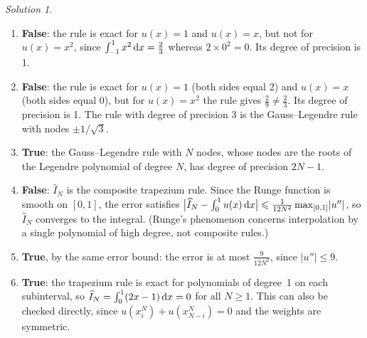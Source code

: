 \documentclass[10pt]{article}
\theoremstyle{definition}
\theoremstyle{remark}
\newtheorem*{protosolution}{Solution}
\newenvironment{solutionframe}
{%
    \begin{mdframed}[
        leftmargin=1cm,
        skipabove=.3cm,
        linecolor=blue,
        backgroundcolor=lightgreen,
        linewidth=0pt,
        innerleftmargin=.5em,
        innerrightmargin=.5em,
        innertopmargin=.3em,
        innerbottommargin=.6em,
    ]
}
{
    \end{mdframed}
}
\newenvironment{solution}
{\pushQED{\qed}\renewcommand{\qedsymbol}{$\triangle$}
\begin{solutionframe}\small \begin{protosolution}}
{\popQED\end{protosolution}\end{solutionframe}}
\begin{document}
\begin{solution}
    \begin{enumerate}
        \item \textbf{False}:
            the rule is exact for $u(x) = 1$ and $u(x) = x$,
            but not for $u(x) = x^2$,
            since $\int_{-1}^{1} x^2 \, \mathrm d x = \frac{2}{3}$ whereas $2 \times 0^2 = 0$.
            Its degree of precision is 1.

        \item \textbf{False}:
            the rule is exact for $u(x) = 1$ (both sides equal 2) and $u(x) = x$ (both sides equal 0),
            but for $u(x) = x^2$ the rule gives $\frac{2}{9} \neq \frac{2}{3}$.
            Its degree of precision is 1.
            The rule with degree of precision 3 is the Gauss--Legendre rule with nodes $\pm 1/\sqrt{3}$.

        \item \textbf{True}:
            the Gauss--Legendre rule with $N$ nodes,
            whose nodes are the roots of the Legendre polynomial of degree $N$,
            has degree of precision $2N - 1$.

        \item \textbf{False}:
            $\widehat I_N$ is the composite trapezium rule.
            Since the Runge function is smooth on $[0, 1]$,
            the error satisfies $\bigl\lvert \widehat I_N - \int_0^1 u(x) \, \mathrm d x \bigr\rvert \leqslant \frac{1}{12 N^2} \max_{[0, 1]} \lvert u'' \rvert$,
            so $\widehat I_N$ converges to the integral.
            (Runge's phenomenon concerns interpolation by a single polynomial of high degree,
            not composite rules.)

        \item \textbf{True},
            by the same error bound: the error is at most $\frac{9}{12 N^2}$, since $\lvert u'' \rvert \leq 9$.

        \item \textbf{True}:
            the trapezium rule is exact for polynomials of degree~1 on each subinterval,
            so $\widehat I_N = \int_0^1 (2x - 1) \, \mathrm d x = 0$ for all $N \geq 1$.
            This can also be checked directly,
            since $u(x^N_i) + u(x^N_{N-i}) = 0$ and the weights are symmetric.
    \end{enumerate}
\end{solution}
\end{document}
